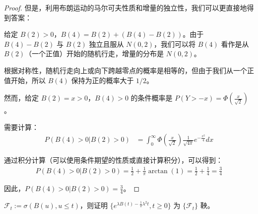 \documentclass[lang=cn,10pt,thmcnt=section]{elegantbook}
\begin{document}
\begin{proof}
但是，利用布朗运动的马尔可夫性质和增量的独立性，我们可以更直接地得到答案：

给定 $B(2) > 0$，$B(4) = B(2) + (B(4) - B(2))$。由于 $B(4) - B(2)$ 与 $B(2)$ 独立且服从 $N(0, 2)$，我们可以将 $B(4)$ 看作是从 $B(2)$（一个正值）开始的随机行走，增量的分布是 $N(0, 2)$。

根据对称性，随机行走向上或向下跨越零点的概率是相等的，但由于我们从一个正值开始，所以 $B(4)$ 保持为正的概率大于 $1/2$。

然而，给定 $B(2) = x > 0$，$B(4) > 0$ 的条件概率是 $P(Y > -x) = \Phi\left(\frac{x}{\sqrt{2}}\right)$。

需要计算：
\begin{align}
P(B(4) > 0 | B(2) > 0) &= \int_{0}^{\infty} \Phi\left(\frac{x}{\sqrt{2}}\right) \frac{1}{\sqrt{4\pi}} e^{-\frac{x^2}{4}} dx
\end{align}

通过积分计算（可以使用条件期望的性质或直接计算积分），可以得到：
\begin{align}
P(B(4) > 0 | B(2) > 0) = \frac{1}{2} + \frac{1}{\pi} \arctan(1) = \frac{1}{2} + \frac{1}{4} = \frac{3}{4}
\end{align}

因此，$P(B(4) > 0 | B(2) > 0) = \frac{3}{4}$。
\end{proof}
\begin{example}
	$\mathcal{F}_t := \sigma(B(u), u \leq t)$，则证明 $\{e^{\lambda B(t) - \frac{1}{2} \lambda^2 t}, t \geq 0\}$ 为 $\{\mathcal{F}_t\}$ 鞅。
\end{example}
\end{document}
